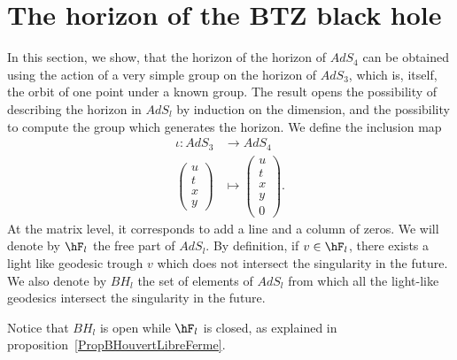 \section{The horizon of the BTZ black hole}
\label{SecNewWithMatrices}

In this section, we show, that the horizon of the horizon of $AdS_4$ can be obtained using the action of a very simple group on the horizon of $AdS_3$, which is, itself, the orbit of one point under a known group. The result opens the possibility of describing the horizon in $AdS_l$ by induction on the dimension, and the possibility to compute the group which generates the horizon.  We define the inclusion map
\begin{equation}
	\begin{aligned}
		\iota\colon AdS_3&\to AdS_4 \\
		\begin{pmatrix}
			u	\\
			t	\\
			x	\\
			y
		\end{pmatrix}&\mapsto \begin{pmatrix}
			u	\\
			t	\\
			x	\\
			y	\\
			0
		\end{pmatrix}.
	\end{aligned}
\end{equation}
At the matrix level, it corresponds to add a line and a column of zeros. We will denote by $\hF_l$ the free part of $AdS_l$. By definition, if $v\in\hF_l$, there exists a light like geodesic trough $v$ which does not intersect the singularity in the future. We also denote by $BH_l$ the set of elements of $AdS_l$ from which all the light-like geodesics intersect the singularity in the future.

Notice that $BH_l$ is open while $\hF_l$ is closed, as explained in proposition~\ref{PropBHouvertLibreFerme}.

